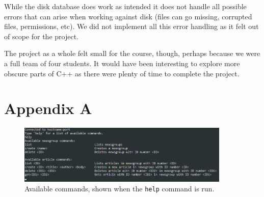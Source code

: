 \documentclass[a4paper]{article}
\begin{document}
While the disk database does work as intended it does not handle all possible errors that can arise when working against disk (files can go missing, corrupted files, permissions, etc). We did not implement all this error handling as it felt out of scope for the project.

The project as a whole felt small for the course, though, perhaps because we were a full team of four students. It would have been interesting to explore more obscure parts of C++ as there were plenty of time to complete the project.



\section*{Appendix A}


\begin{figure}[h]
    \centering
    \includegraphics[width=0.9\textwidth]{help_text_appendix.png}
    \caption{Available commands, shown when the \texttt{help} command is run.}
    \label{fig:help}
\end{figure}
\end{document}
